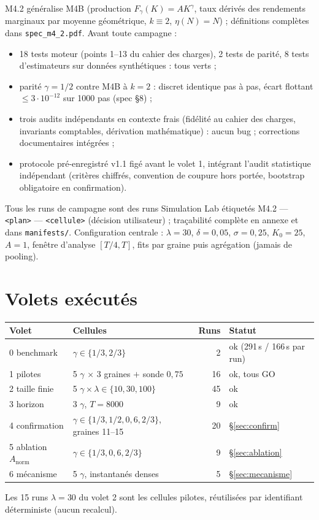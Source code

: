 \documentclass[11pt,a4paper]{article}
\newcommand{\code}[1]{\texttt{#1}}
\begin{document}
M4.2 généralise M4B (production $F_\gamma(K)=A K^\gamma$, taux dérivés des
rendements marginaux par moyenne géométrique, $k\equiv2$,
$\eta(N)=N$) ; définitions complètes dans \code{spec\_m4\_2.pdf}. Avant
toute campagne :
\begin{itemize}
\item 18 tests moteur (points 1--13 du cahier des charges), 2 tests de
parité, 8 tests d'estimateurs sur données synthétiques : tous verts ;
\item parité $\gamma=1/2$ contre M4B à $k=2$ : discret identique pas à
pas, écart flottant $\le3\cdot10^{-12}$ sur 1000 pas (spec §8) ;
\item trois audits indépendants en contexte frais (fidélité au cahier des
charges, invariants comptables, dérivation mathématique) : aucun bug ;
corrections documentaires intégrées ;
\item protocole pré-enregistré v1.1 figé avant le volet 1, intégrant
l'audit statistique indépendant (critères chiffrés, convention de coupure
hors portée, bootstrap obligatoire en confirmation).
\end{itemize}

Tous les runs de campagne sont des runs Simulation Lab étiquetés
\og M4.2 --- \code{<plan>} --- \code{<cellule>} \fg{} (décision
utilisateur) ; traçabilité complète en annexe et dans
\code{manifests/}. Configuration centrale : $\lambda=30$, $\delta=0{,}05$,
$\sigma=0{,}25$, $K_0=25$, $A=1$, fenêtre d'analyse $[T/4,T]$, fits par
graine puis agrégation (jamais de pooling).

\section{Volets exécutés}

\begin{center}
\begin{tabular}{llrl}
\toprule
Volet & Cellules & Runs & Statut\\
\midrule
0 benchmark & $\gamma\in\{1/3,2/3\}$ & 2 & ok (291\,s / 166\,s par run)\\
1 pilotes & 5 $\gamma$ $\times$ 3 graines $+$ sonde $0{,}75$ & 16 & ok, tous GO\\
2 taille finie & 5 $\gamma\times\lambda\in\{10,30,100\}$ & 45 & ok\\
3 horizon & 3 $\gamma$, $T=8000$ & 9 & ok\\
4 confirmation & $\gamma\in\{1/3,1/2,0{,}6,2/3\}$, graines 11--15 & 20 & \S\ref{sec:confirm}\\
5 ablation $A_{\mathrm{norm}}$ & $\gamma\in\{1/3,0{,}6,2/3\}$ & 9 & \S\ref{sec:ablation}\\
6 mécanisme & 5 $\gamma$, instantanés denses & 5 & \S\ref{sec:mecanisme}\\
\bottomrule
\end{tabular}
\end{center}
{\footnotesize Les 15 runs $\lambda=30$ du volet 2 sont les cellules
pilotes, réutilisées par identifiant déterministe (aucun recalcul).}
\end{document}
